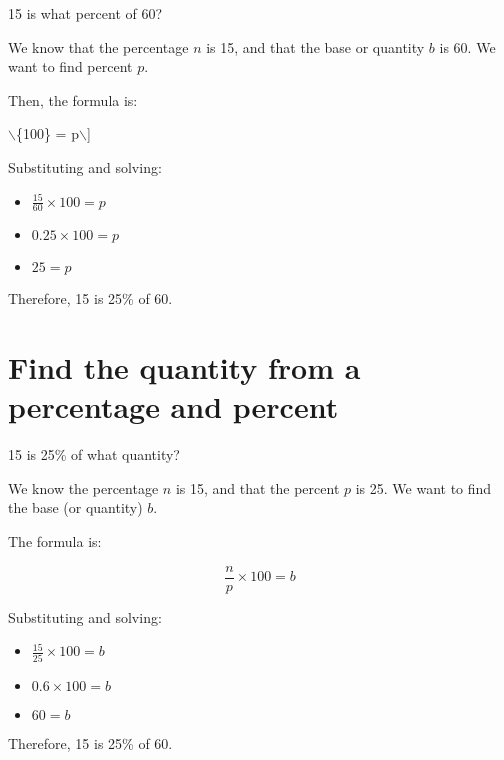 \documentclass[11pt]{article}
\begin{document}
15 is what percent of 60?

We know that the percentage \(n\) is 15, and that the base or quantity
\(b\) is 60. We want to find percent \(p\).

Then, the formula is:

$\backslash$\texttimes{}\{100\} = p$\backslash$]

Substituting and solving:

\begin{itemize}
\item \(\frac{15}{60}\times{100} = p\)
\item \(0.25\times{100} = p\)
\item \(25 = p\)
\end{itemize}

Therefore, 15 is 25\% of 60.

\section{Find the quantity from a percentage and percent}
\label{sec:org1b77077}

15 is 25\% of what quantity?

We know the percentage \(n\) is 15, and that the percent \(p\)
is 25. We want to find the base (or quantity) \(b\).

The formula is:

\[\frac{n}{p}\times{100} = b\]


Substituting and solving:

\begin{itemize}
\item \(\frac{15}{25}\times{100} = b\)
\item \(0.6\times{100} = b\)
\item \(60 = b\)
\end{itemize}

Therefore, 15 is 25\% of 60.
\end{document}
